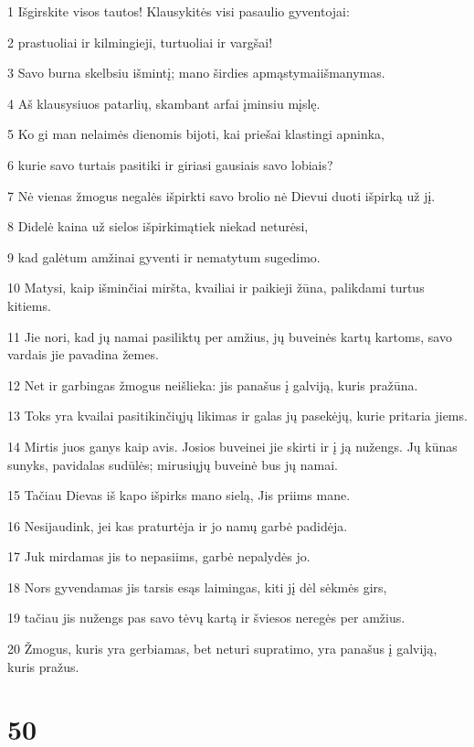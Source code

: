 \par 1 Išgirskite visos tautos! Klausykitės visi pasaulio gyventojai: 
\par 2 prastuoliai ir kilmingieji, turtuoliai ir vargšai! 
\par 3 Savo burna skelbsiu išmintį; mano širdies apmąstymai­išmanymas. 
\par 4 Aš klausysiuos patarlių, skambant arfai įminsiu mįslę. 
\par 5 Ko gi man nelaimės dienomis bijoti, kai priešai klastingi apninka, 
\par 6 kurie savo turtais pasitiki ir giriasi gausiais savo lobiais? 
\par 7 Nė vienas žmogus negalės išpirkti savo brolio nė Dievui duoti išpirką už jį. 
\par 8 Didelė kaina už sielos išpirkimą­tiek niekad neturėsi, 
\par 9 kad galėtum amžinai gyventi ir nematytum sugedimo. 
\par 10 Matysi, kaip išminčiai miršta, kvailiai ir paikieji žūna, palikdami turtus kitiems. 
\par 11 Jie nori, kad jų namai pasiliktų per amžius, jų buveinės kartų kartoms, savo vardais jie pavadina žemes. 
\par 12 Net ir garbingas žmogus neišlieka: jis panašus į galviją, kuris pražūna. 
\par 13 Toks yra kvailai pasitikinčiųjų likimas ir galas jų pasekėjų, kurie pritaria jiems. 
\par 14 Mirtis juos ganys kaip avis. Josios buveinei jie skirti ir į ją nužengs. Jų kūnas sunyks, pavidalas sudūlės; mirusiųjų buveinė bus jų namai. 
\par 15 Tačiau Dievas iš kapo išpirks mano sielą, Jis priims mane. 
\par 16 Nesijaudink, jei kas praturtėja ir jo namų garbė padidėja. 
\par 17 Juk mirdamas jis to nepasiims, garbė nepalydės jo. 
\par 18 Nors gyvendamas jis tarsis esąs laimingas, kiti jį dėl sėkmės girs, 
\par 19 tačiau jis nužengs pas savo tėvų kartą ir šviesos neregės per amžius. 
\par 20 Žmogus, kuris yra gerbiamas, bet neturi supratimo, yra panašus į galviją, kuris pražus.



\chapter{50}



